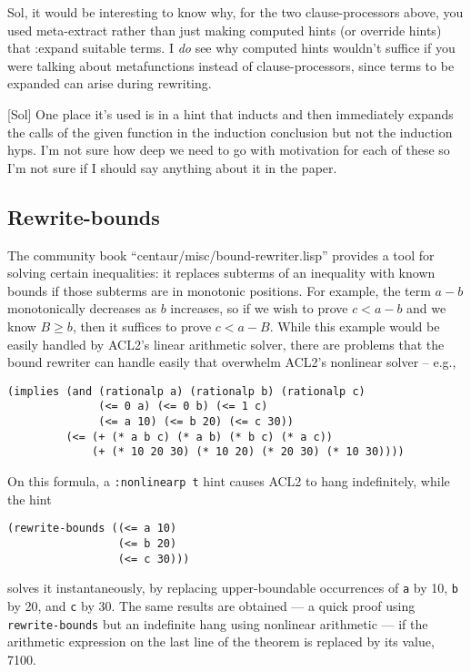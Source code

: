 \begin{mycomment}
  Sol, it would be interesting to know why, for the two
  clause-processors above, you used meta-extract rather than just
  making computed hints (or override hints) that :expand suitable
  terms.  I {\em do} see why computed hints wouldn't suffice if you
  were talking about metafunctions instead of clause-processors, since
  terms to be expanded can arise during rewriting.

  [Sol] One place it's used is in a hint that inducts and then
  immediately expands the calls of the given function in the induction
  conclusion but not the induction hyps.  I'm not sure how deep we
  need to go with motivation for each of these so I'm not sure if I
  should say anything about it in the paper.
\end{mycomment}

\subsection{Rewrite-bounds}

The community book ``centaur/misc/bound-rewriter.lisp'' provides a
tool for solving certain inequalities: it replaces subterms of an
inequality with known bounds if those subterms are in monotonic
positions.  For example, the term $a-b$ monotonically decreases as $b$
increases, so if we wish to prove $c<a-b$ and we know $B \geq b$, then
it suffices to prove $c<a-B$.  While this example would be easily
handled by ACL2's linear arithmetic solver, there are problems that
the bound rewriter can handle easily that overwhelm ACL2's nonlinear
solver -- e.g.,
\begin{verbatim}
(implies (and (rationalp a) (rationalp b) (rationalp c)
              (<= 0 a) (<= 0 b) (<= 1 c)
              (<= a 10) (<= b 20) (<= c 30))
         (<= (+ (* a b c) (* a b) (* b c) (* a c))
             (+ (* 10 20 30) (* 10 20) (* 20 30) (* 10 30))))
\end{verbatim}
On this formula, a \texttt{:nonlinearp t} hint causes ACL2 to hang indefinitely, while the hint
\begin{verbatim}
(rewrite-bounds ((<= a 10)
                 (<= b 20)
                 (<= c 30)))
\end{verbatim}
solves it instantaneously, by replacing upper-boundable occurrences of
\texttt{a} by 10, \texttt{b} by 20, and \texttt{c} by 30.  The same
results are obtained --- a quick proof using {\tt rewrite-bounds} but
an indefinite hang using nonlinear arithmetic --- if the arithmetic
expression on the last line of the theorem is replaced by its value,
7100.

